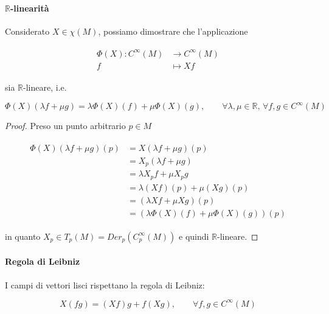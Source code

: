 \paragraph{$ \mathbb{R} $-linearità}

Considerato $ X \in \chi(M) $, possiamo dimostrare che l'applicazione

\begin{align}
	\begin{split}
		\Phi(X) : C^{\infty}(M) &\to C^{\infty}(M)\\
		f &\mapsto X f
	\end{split}
\end{align}

sia $ \mathbb{R} $-lineare, i.e.

\begin{equation}
	\Phi(X)(\lambda f + \mu g) = \lambda \Phi(X)(f) + \mu \Phi(X)(g), \qquad \forall \lambda,\mu \in \mathbb{R}, \, \forall f,g \in C^{\infty}(M)
\end{equation}

\begin{proof}
	Preso un punto arbitrario $ p \in M $
	
	\begin{align}
		\begin{split}
			\Phi(X)(\lambda f + \mu g)(p) &= X(\lambda f + \mu g)(p)\\
			&= X_{p}(\lambda f + \mu g)\\
			&= \lambda X_{p} f + \mu X_{p} g\\
			&= \lambda (X f)(p) + \mu (X g)(p)\\
			&= (\lambda X f + \mu X g)(p)\\
			&= (\lambda \Phi(X)(f) + \mu \Phi(X)(g))(p)
		\end{split}
	\end{align}

	in quanto $ X_{p} \in T_{p}(M) = Der_{p}(C_{p}^{\infty}(M)) $ e quindi $ \mathbb{R} $-lineare.
\end{proof}

\paragraph{Regola di Leibniz}

I campi di vettori lisci rispettano la regola di Leibniz:

\begin{equation}
	X(f g) = (X f) g + f (X g), \qquad \forall f,g \in C^{\infty}(M)
\end{equation}

